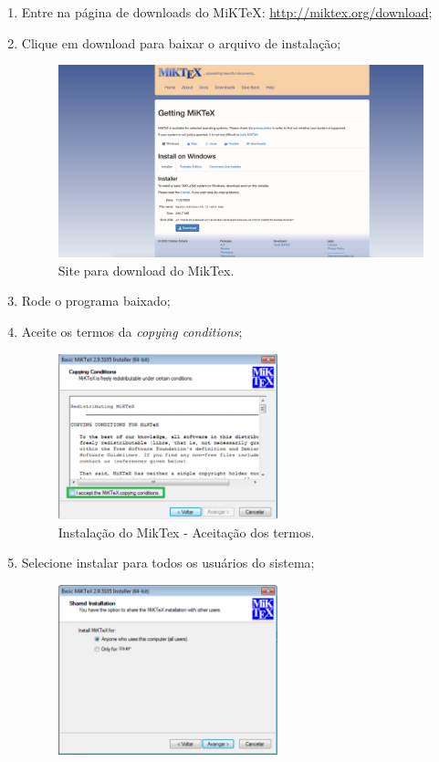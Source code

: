 \begin{enumerate}
\item Entre na página de downloads do MiKTeX: \url{http://miktex.org/download};
\item Clique em download para baixar o arquivo de instalação;
\begin{figure}[!ht]
  \centering
  \includegraphics[width=1.0\textwidth]{./fig/miktex01}
  \caption{Site para download do MikTex.}
  \label{fig:miktex01}
\end{figure}
\item Rode o programa baixado;
\item Aceite os termos da \textit{copying conditions};
\begin{figure}[H]
  \centering
  \includegraphics[width=0.6\textwidth]{./fig/miktex02}
  \caption{Instalação do MikTex - Aceitação dos termos.}
\end{figure}
\item Selecione instalar para todos os usuários do sistema;
\begin{figure}[H]
  \centering
  \includegraphics[width=0.6\textwidth]{./fig/miktex03}

\end{figure}
\end{enumerate}
